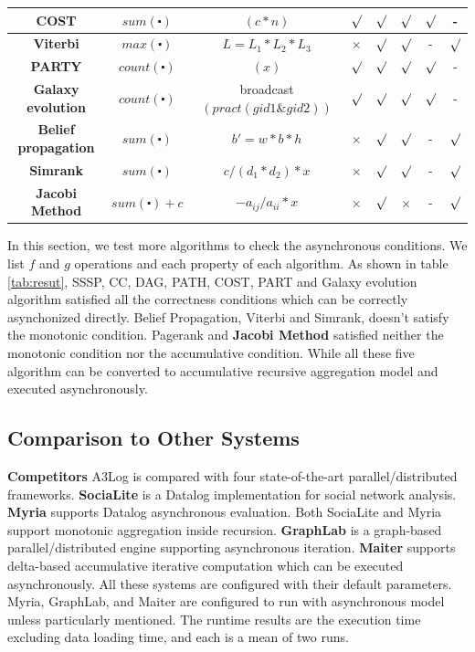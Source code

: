 \begin{table}[!t]
\begin{tabular}{c|c|c|c|c|c|c|c}
		\hline
		\textbf{COST} & $sum(\centerdot)$&$(c*n)$ & $\surd$ & $\surd$ & $\surd$ & $\surd$ & -\\
		\hline
		\textbf{Viterbi} & $max(\centerdot)$ & $L=L_1*L_2*L_3$ & $\times$ & $\surd$ &  $\surd$ &  - &$\surd$\\
		\hline
		\textbf{PARTY} & $count(\centerdot)$&$(x)$ & $\surd$ & $\surd$ & $\surd$ & $\surd$ & -\\
		\hline
		\textbf{Galaxy evolution} & $count(\centerdot)$ &broadcast$(pract(gid1\& gid2))$ & $\surd$ & $\surd$ & $\surd$ & $\surd$ & -\\
		\hline
		\textbf{Belief propagation} & $sum(\centerdot)$ &$b'=w*b*h$ & $\times$ & $\surd$ & $\surd$ & - & $\surd$\\
		\hline
		\textbf{Simrank} & $sum(\centerdot)$& $c/(d_1*d_2)*x$ & $\times$ &  $\surd$ &  $\surd$ & - & $\surd$\\
		\hline
		\textbf{Jacobi Method} &$sum(\centerdot)+c$ &$-a_{ij}/a_{ii}*x$& $\times$ & $\surd$  & $\times$ & - & $\surd$\\
		\hline
		\hline
	\end{tabular}
	\vspace{-0.1in}
\end{table}

In this section, we test more algorithms to check the asynchronous conditions. We list $f$ and $g$ operations and each property of each algorithm. As shown in table \ref{tab:resut}, SSSP, CC, DAG, PATH, COST, PART and Galaxy evolution algorithm satisfied all the correctness conditions which can be correctly asynchonized directly. Belief Propagation, Viterbi and Simrank, doesn't satisfy the monotonic condition. Pagerank and \textbf{Jacobi Method} satisfied neither the monotonic condition nor the accumulative condition. While all these five algorithm can be converted to accumulative recursive aggregation model and executed asynchronously. 

\subsection{Comparison to Other Systems}
\label{sec:expr:othersystems}

\noindent\textbf{Competitors}
A3Log is compared with four state-of-the-art parallel/distributed frameworks. \textbf{SociaLite} \cite{Lam:2013:SDE:2510649.2511289,Seo:2013:DSD:2556549.2556572} is a Datalog implementation for social network analysis. \textbf{Myria} \cite{Halperin:2014:DMB:2588555.2594530,Wang:2015:AFR:2824032.2824052} supports Datalog asynchronous evaluation. Both SociaLite and Myria support monotonic aggregation inside recursion. \textbf{GraphLab} \cite{Low:2012:DGF:2212351.2212354} is a graph-based parallel/distributed engine supporting asynchronous iteration. \textbf{Maiter} \cite{maiter} supports delta-based accumulative iterative computation which can be executed asynchronously. All these systems are configured with their default parameters. Myria, GraphLab, and Maiter are configured to run with asynchronous model unless particularly mentioned. The runtime results are the execution time excluding data loading time, and each is a mean of two runs.

